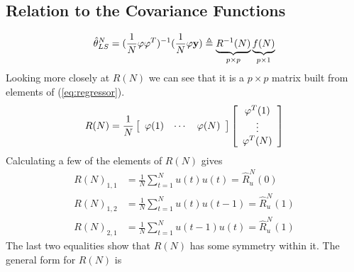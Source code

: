 \subsection{Relation to the Covariance Functions}
$$\hat{\theta}_{LS}^N = (\frac{1}{N}\mathbf{\varphi\varphi}^T)^{-1}(\frac{1}{N}\mathbf{\varphi y}) \triangleq \underbrace{R^{-1}(N)}_{p\times p} \underbrace{f(N)}_{p\times 1}$$
Looking more closely at $R(N)$ we can see that it is a $p\times p$ matrix built from elements of (\ref{eq:regressor}).
$$R(N) = \frac{1}{N}\left[\begin{array}{c c c} \varphi(1) & \cdots & \varphi(N) \end{array}\right]
\left[\begin{array}{c} \varphi^T(1) \\ \vdots \\ \varphi^T(N) \end{array}\right]$$
Calculating a few of the elements of $R(N)$ gives
\begin{align*}
R(N)_{1,1} &= \frac{1}{N}\sum_{t=1}^Nu(t)u(t) = \hat{R}_u^N(0) \\
R(N)_{1,2} &= \frac{1}{N}\sum_{t=1}^Nu(t)u(t-1) = \hat{R}_u^N(1) \\
R(N)_{2,1} &= \frac{1}{N}\sum_{t=1}^Nu(t-1)u(t) = \hat{R}_u^N(1)
\end{align*}
The last two equalities show that $R(N)$ has some symmetry within it. The general form for $R(N)$ is
